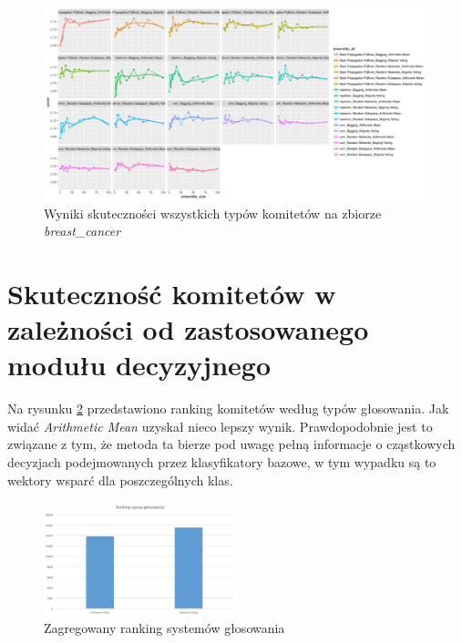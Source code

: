 \documentclass[11pt, a4paper, titlepage]{report}
\begin{document}
\begin{figure}[H]
	\includegraphics[width=1.0\textwidth]{type2_score_size_model_breast_cancer}
    \centering
    \caption{Wyniki skuteczności wszystkich typów komitetów na zbiorze \textit{breast\_cancer}}
    \label{fig:type2_breast_cancer}
\end{figure}

\section{Skuteczność komitetów w zależności od zastosowanego modułu decyzyjnego}

Na rysunku \ref{fig:aggr_rank_voting} przedstawiono ranking komitetów według typów głosowania. Jak widać \textit{Arithmetic Mean} uzyskał nieco lepszy wynik. Prawdopodobnie jest to związane z tym, że metoda ta bierze pod uwagę pełną informacje o cząstkowych decyzjach podejmowanych przez klasyfikatory bazowe, w tym wypadku są to wektory wsparć dla poszczególnych klas.

\begin{figure}[H]
	\includegraphics[width=0.5\textwidth]{aggregated_rank_voting}
    \centering
    \caption{Zagregowany ranking systemów głosowania}
    \label{fig:aggr_rank_voting}
\end{figure}
\end{document}
